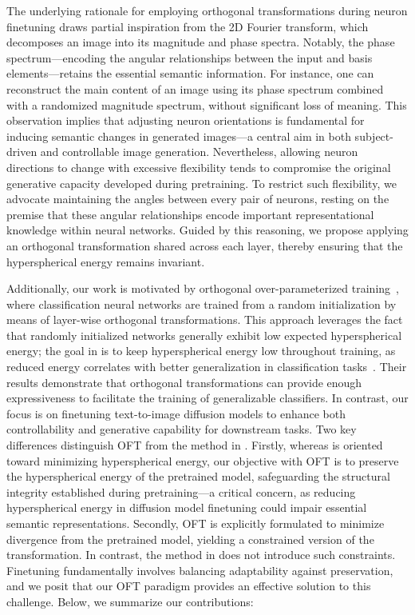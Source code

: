 The underlying rationale for employing orthogonal transformations during neuron finetuning draws partial inspiration from the 2D Fourier transform, which decomposes an image into its magnitude and phase spectra. Notably, the phase spectrum—encoding the angular relationships between the input and basis elements—retains the essential semantic information. For instance, one can reconstruct the main content of an image using its phase spectrum combined with a randomized magnitude spectrum, without significant loss of meaning. This observation implies that adjusting neuron orientations is fundamental for inducing semantic changes in generated images—a central aim in both subject-driven and controllable image generation. Nevertheless, allowing neuron directions to change with excessive flexibility tends to compromise the original generative capacity developed during pretraining. To restrict such flexibility, we advocate maintaining the angles between every pair of neurons, resting on the premise that these angular relationships encode important representational knowledge within neural networks. Guided by this reasoning, we propose applying an orthogonal transformation shared across each layer, thereby ensuring that the hyperspherical energy remains invariant.

Additionally, our work is motivated by orthogonal over-parameterized training~\cite{liu2021orthogonal}, where classification neural networks are trained from a random initialization by means of layer-wise orthogonal transformations. This approach leverages the fact that randomly initialized networks generally exhibit low expected hyperspherical energy; the goal in \cite{liu2021orthogonal} is to keep hyperspherical energy low throughout training, as reduced energy correlates with better generalization in classification tasks~\cite{liu2018learning,lin2020regularizing}. Their results demonstrate that orthogonal transformations can provide enough expressiveness to facilitate the training of generalizable classifiers. In contrast, our focus is on finetuning text-to-image diffusion models to enhance both controllability and generative capability for downstream tasks. Two key differences distinguish OFT from the method in \cite{liu2021orthogonal}. Firstly, whereas \cite{liu2021orthogonal} is oriented toward minimizing hyperspherical energy, our objective with OFT is to preserve the hyperspherical energy of the pretrained model, safeguarding the structural integrity established during pretraining—a critical concern, as reducing hyperspherical energy in diffusion model finetuning could impair essential semantic representations. Secondly, OFT is explicitly formulated to minimize divergence from the pretrained model, yielding a constrained version of the transformation. In contrast, the method in \cite{liu2021orthogonal} does not introduce such constraints. Finetuning fundamentally involves balancing adaptability against preservation, and we posit that our OFT paradigm provides an effective solution to this challenge. Below, we summarize our contributions:


